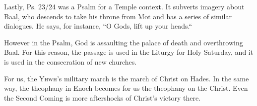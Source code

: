 \documentclass{beamer}
\begin{document}
\begin{frame}
  Lastly, Ps. 23/24 was a Psalm for a Temple context.
  It subverts imagery about Baal, who descends to take his throne from Mot and has a series of similar dialogues.
  He says, for instance, ``O Gods, lift up your heads.“
\end{frame}

\begin{frame}
  However in the Psalm, God is assaulting the palace of death and overthrowing Baal.
  For this reason, the passage is used in the Liturgy for Holy Saturday, and it is used in the consecration of new churches.
\end{frame}

\begin{frame}
  For us, the \textsc{Yhwh}'s military march is the march of Christ on Hades.
  In the same way, the theophany in Enoch becomes for us the theophany on the Christ.
  Even the Second Coming is more aftershocks of Christ's victory there.
\end{frame}
\end{document}
